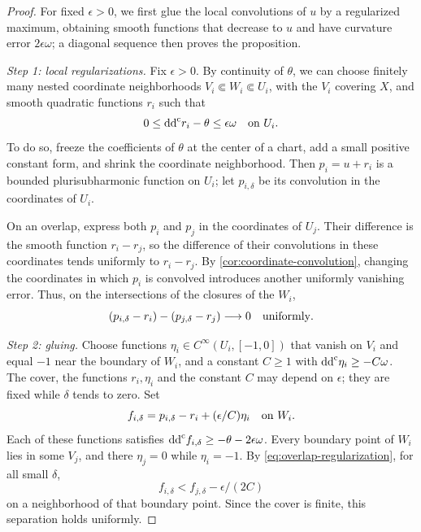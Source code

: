 \begin{proof}
For fixed $\epsilon>0$, we first glue the local convolutions of $u$ by a regularized maximum, obtaining smooth functions that decrease to $u$ and have curvature error $2\epsilon\omega$; a diagonal sequence then proves the proposition.

\emph{Step 1: local regularizations.} Fix $\epsilon>0$. By continuity of $\theta$, we can choose finitely many nested coordinate neighborhoods
$V_i\Subset W_i\Subset U_i$, with the $V_i$ covering $X$, and smooth quadratic functions $r_i$ such that
\[
 0\leq\mathrm{dd}^{\mathrm{c}} r_i-\theta\leq\epsilon\omega\quad\hbox{on }U_i.
\]
To do so, freeze the coefficients of $\theta$ at the center of a chart, add a small positive constant form, and shrink the coordinate neighborhood. Then $p_i=u+r_i$ is a bounded plurisubharmonic function on $U_i$; let $p_{i,\delta}$ be its convolution in the coordinates of $U_i$.

On an overlap, express both $p_i$ and $p_j$ in the coordinates of $U_j$. Their difference is the smooth function $r_i-r_j$, so the difference of their convolutions in these coordinates tends uniformly to $r_i-r_j$. By \cref{cor:coordinate-convolution}, changing the coordinates in which $p_i$ is convolved introduces another uniformly vanishing error. Thus, on the intersections of the closures of the $W_i$,
\begin{equation}\label{eq:overlap-regularization}
 (p_{i,\delta}-r_i)-(p_{j,\delta}-r_j)\longrightarrow0
 \quad\hbox{uniformly}.
\end{equation}

\emph{Step 2: gluing.} Choose functions $\eta_i\in C^\infty(U_i,[-1,0])$ that vanish on $V_i$ and equal $-1$ near the boundary of $W_i$, and a constant $C\geq1$ with $\mathrm{dd}^{\mathrm{c}}\eta_i\geq-C\omega$. The cover, the functions $r_i,\eta_i$ and the constant $C$ may depend on $\epsilon$; they are fixed while $\delta$ tends to zero. Set
\[
 f_{i,\delta}=p_{i,\delta}-r_i+(\epsilon/C)\eta_i
 \quad\hbox{on }W_i.
\]
Each of these functions satisfies $\mathrm{dd}^{\mathrm{c}} f_{i,\delta}\geq-\theta-2\epsilon\omega$. Every boundary point of $W_i$ lies in some $V_j$, and there $\eta_j=0$ while $\eta_i=-1$. By \eqref{eq:overlap-regularization}, for all small $\delta$,
\[
 f_{i,\delta}<f_{j,\delta}-\epsilon/(2C)
\]
on a neighborhood of that boundary point. Since the cover is finite, this separation holds uniformly.


\end{proof}
